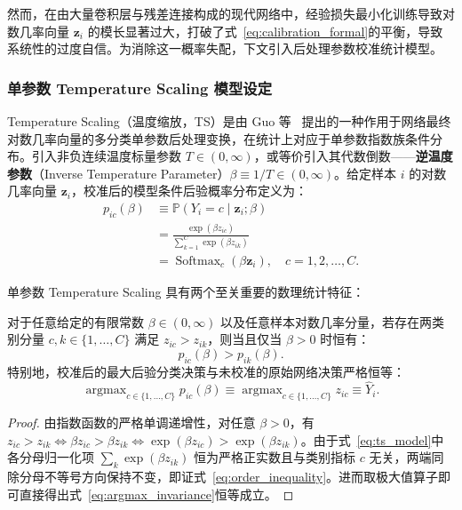然而，在由大量卷积层与残差连接构成的现代网络中，经验损失最小化训练导致对数几率向量 $\boldsymbol{z}_i$ 的模长显著过大，打破了式~\eqref{eq:calibration_formal}的平衡，导致系统性的过度自信。为消除这一概率失配，下文引入后处理参数校准统计模型。

\subsubsection{单参数 Temperature Scaling 模型设定}

Temperature Scaling（温度缩放，TS）是由 Guo 等~\cite{guo2017calibration} 提出的一种作用于网络最终对数几率向量的多分类单参数后处理变换，在统计上对应于单参数指数族条件分布。引入非负连续温度标量参数 $T \in (0, \infty)$，或等价引入其代数倒数——\textbf{逆温度参数}（Inverse Temperature Parameter）$\beta \equiv 1/T \in (0, \infty)$。给定样本 $i$ 的对数几率向量 $\boldsymbol{z}_i$，校准后的模型条件后验概率分布定义为：
\begin{equation}\label{eq:ts_model}
\begin{split}
p_{ic}(\beta) &\equiv \mathbb{P}(Y_i = c \mid \boldsymbol{z}_i; \beta) \\
&= \frac{\exp(\beta z_{ic})}{\sum_{k=1}^C \exp(\beta z_{ik})} \\
&= \operatorname{Softmax}_c(\beta \boldsymbol{z}_i), \quad c = 1, 2, \dots, C.
\end{split}
\end{equation}

单参数 Temperature Scaling 具有两个至关重要的数理统计特征：
\begin{prop}\label{prop:order_preservation}
对于任意给定的有限常数 $\beta \in (0, \infty)$ 以及任意样本对数几率分量，若存在两类别分量 $c, k \in \{1, \dots, C\}$ 满足 $z_{ic} > z_{ik}$，则当且仅当 $\beta > 0$ 时恒有：
\begin{equation}\label{eq:order_inequality}
p_{ic}(\beta) > p_{ik}(\beta).
\end{equation}
特别地，校准后的最大后验分类决策与未校准的原始网络决策严格恒等：
\begin{equation}\label{eq:argmax_invariance}
\operatorname{argmax}_{c \in \{1,\dots,C\}} p_{ic}(\beta) \equiv \operatorname{argmax}_{c \in \{1,\dots,C\}} z_{ic} \equiv \hat Y_i.
\end{equation}
\end{prop}

\begin{proof}
由指数函数的严格单调递增性，对任意 $\beta > 0$，有 $z_{ic} > z_{ik} \iff \beta z_{ic} > \beta z_{ik} \iff \exp(\beta z_{ic}) > \exp(\beta z_{ik})$。由于式~\eqref{eq:ts_model}中各分母归一化项 $\sum_k \exp(\beta z_{ik})$ 恒为严格正实数且与类别指标 $c$ 无关，两端同除分母不等号方向保持不变，即证式~\eqref{eq:order_inequality}。进而取极大值算子即可直接得出式~\eqref{eq:argmax_invariance}恒等成立。
\end{proof}

